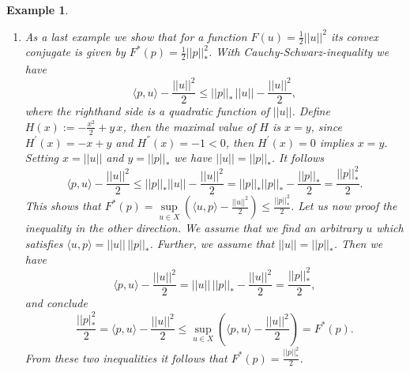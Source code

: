 \documentclass[abstracton]{scrreprt}
\newtheorem{example}[theorem]{Example}
\begin{document}
\begin{example}
\begin{enumerate}
$$                    $$
                This shows $F^{\ast}(p) = \infty$. On the other hand if we assume that $||p||_{\ast} \le 1$, Cauchy-Schwarz-inequality assures
                    $$
                        \langle p, u \rangle \le ||u|| \, ||p||_{\ast}
                    $$
                for all $u \in X$. This implies
                    $$
                        \langle p, u \rangle - ||u|| \le ||u|| \, ||p||_{\ast} - ||u|| = ||u|| \, (||p||_{\ast} - 1) \le 0.
                    $$
                Since $||p||_{\ast} \le 1$ holds, we need to choose $u = 0$ to attain the supremum in $F^{\ast}(p)$. This shows that $F^{\ast} = \sup\limits_{u \in X} \left( \langle p, 0 \rangle - ||0|| \right) = 0$.
                \item As a last example we show that for a function $F(u) = \frac{1}{2} ||u||^{2}$ its convex conjugate is given by $F^{\ast}(p) = \frac{1}{2} ||p||_{\ast}^{2}$. With Cauchy-Schwarz-inequality we have
                    $$
                        \langle p, u \rangle - \frac{||u||^{2}}{2} \le ||p||_{\ast}\,||u|| - \frac{||u||^{2}}{2},
                    $$
                where the righthand side is a quadratic function of $||u||$. Define $H(x) := -\frac{x^{2}}{2} + y\,x$, then the maximal value of $H$ is $x = y$, since $H^{'}(x) = -x + y$ and $H^{''}(x) = -1 < 0$, then $H^{'}(x) = 0$ implies $x = y$. Setting $x = ||u||$ and $y = ||p||_{\ast}$ we have $||u|| = ||p||_{\ast}$. It follows
                    $$
                        \langle p, u \rangle - \frac{||u||^{2}}{2} \le ||p||_{\ast}||u|| - \frac{||u||^{2}}{2} = ||p||_{\ast} ||p||_{\ast} - \frac{||p||_{\ast}}{2} = \frac{||p||_{\ast}^{2}}{2}.
                    $$
                This shows that $F^{\ast}(p) = \sup\limits_{u \in X} \left( \langle u, p \rangle - \frac{||u||^{2}}{2} \right) \le \frac{||p||_{\ast}^{2}}{2}$. Let us now proof the inequality in the other direction. We assume that we find an arbitrary $u$ which satisfies $\langle u, p \rangle = ||u||\,||p||_{\ast}$. Further, we assume that $||u|| = ||p||_{\ast}$. Then we have
                    $$
                        \langle p, u \rangle - \frac{||u||^{2}}{2} = ||u||\,||p||_{\ast} - \frac{||u||^{2}}{2} = \frac{||p||^{2}_{\ast}}{2},
                    $$
                and conclude
                    $$
                        \frac{||p|_{\ast}^{2}}{2} = \langle p, u \rangle - \frac{||u||^{2}}{2} \le \sup\limits_{u \in X} \left( \langle p, u \rangle - \frac{||u||^{2}}{2} \right) = F^{\ast}(p).
                    $$
                From these two inequalities it follows that $F^{\ast}(p) = \frac{||p||_{\ast}^{2}}{2}$.
            \end{enumerate}
        \end{example}
\end{document}
